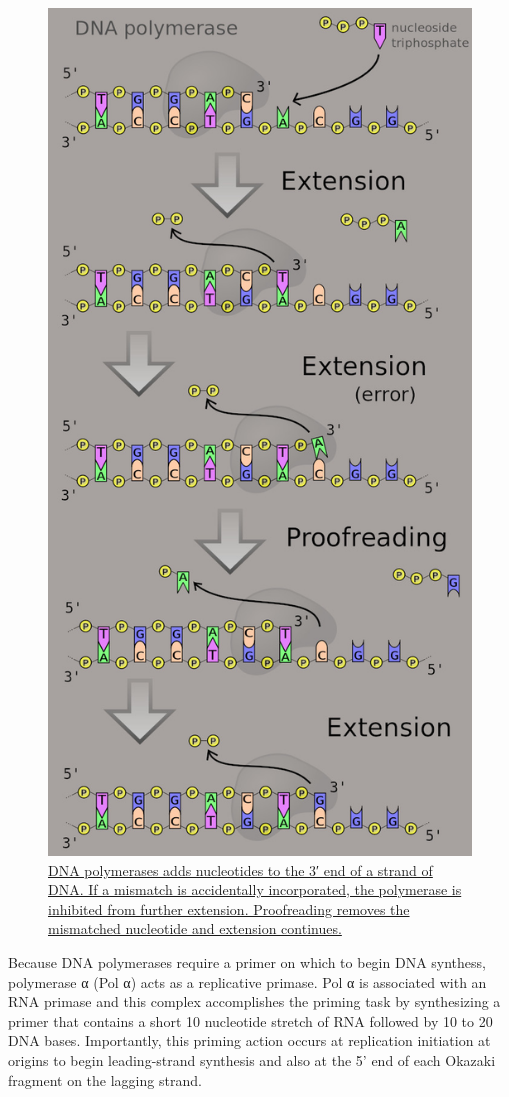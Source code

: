 \begin{figure}

{\centering \includegraphics[width=0.7\linewidth]{./figures/replication/DNA_polymerase} 

}

\caption{\href{https://commons.wikimedia.org/wiki/File:DNA_polymerase.svg}{DNA polymerases adds nucleotides to the 3′ end of a strand of DNA. If a mismatch is accidentally incorporated, the polymerase is inhibited from further extension. Proofreading removes the mismatched nucleotide and extension continues.}}\label{fig:polymerase}
\end{figure}

Because DNA polymerases require a primer on which to begin DNA synthess, polymerase α (Pol α) acts as a replicative primase. Pol α is associated with an RNA primase and this complex accomplishes the priming task by synthesizing a primer that contains a short 10 nucleotide stretch of RNA followed by 10 to 20 DNA bases. Importantly, this priming action occurs at replication initiation at origins to begin leading-strand synthesis and also at the 5' end of each Okazaki fragment on the lagging strand.

